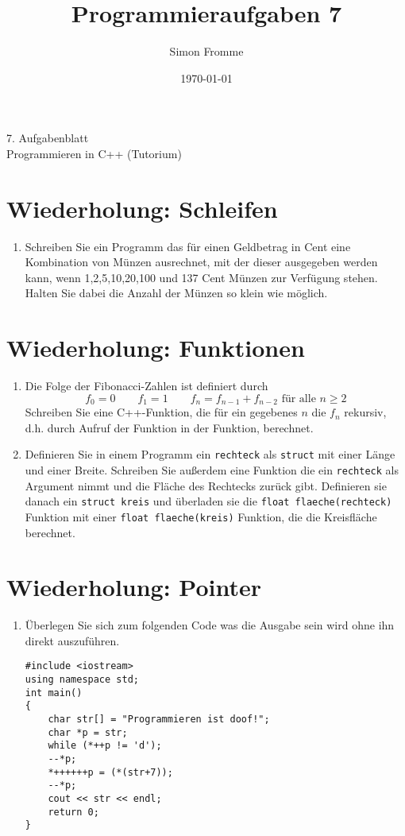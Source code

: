 \documentclass[paper=a4, fontsize=11pt, twoside]{scrartcl}
\title{Programmieraufgaben 7}
\author{Simon Fromme}
\date{\normalsize\today}
\begin{document}
\vspace*{0.75\baselineskip}
\begin{center}
  \Large 7. Aufgabenblatt \\\vspace{0.5em} \large Programmieren in C++ (Tutorium)
\end{center}
\section*{Wiederholung: Schleifen}
\begin{enumerate}
	\item Schreiben Sie ein Programm das für einen Geldbetrag in Cent eine Kombination von Münzen ausrechnet, mit der dieser ausgegeben werden kann, wenn 1,2,5,10,20,100 und 137 Cent Münzen zur Verfügung stehen. Halten Sie dabei die Anzahl der Münzen so klein wie möglich. 
\end{enumerate}


\section*{Wiederholung: Funktionen}
\begin{enumerate}
  \item Die Folge der Fibonacci-Zahlen ist definiert durch 
	  \[
		  f_0=0 \qquad f_1=1 \qquad f_n=f_{n-1} + f_{n-2} \text{ für alle } n\geq 2
	  \]
	  Schreiben Sie eine C++-Funktion, die für ein gegebenes $n$ die $f_n$ rekursiv, d.h. durch Aufruf der Funktion in der Funktion, berechnet.
  \item Definieren Sie in einem Programm ein \texttt{rechteck} als \texttt{struct} mit einer Länge und einer Breite.
	  Schreiben Sie außerdem eine Funktion die ein \texttt{rechteck} als Argument nimmt und die Fläche des Rechtecks zurück gibt. 
	  Definieren sie danach ein \texttt{struct kreis} und überladen sie die \texttt{float flaeche(rechteck)} Funktion mit einer \texttt{float flaeche(kreis)} Funktion, die die Kreisfläche berechnet.
\end{enumerate}

\section*{Wiederholung: Pointer}
\begin{enumerate}
  \item Überlegen Sie sich zum folgenden Code was die Ausgabe sein wird ohne ihn direkt auszuführen. 
	  \begin{verbatim}
#include <iostream>
using namespace std;
int main()
{
	char str[] = "Programmieren ist doof!";
	char *p = str;
	while (*++p != 'd');
	--*p;
	*++++++p = (*(str+7));
	--*p;
	cout << str << endl;
	return 0;
}
	  \end{verbatim}
\end{enumerate}
\end{document}
